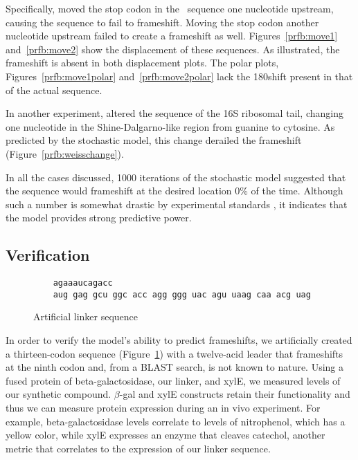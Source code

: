 \documentclass[12pt, draft]{article}
\numberwithin{equation}{section}
\begin{document}

Specifically, \citeauthor{weiss87} moved the stop codon in the
\prfB\ sequence one nucleotide upstream, causing the sequence to fail to
frameshift. Moving the stop codon another nucleotide upstream failed
to create a frameshift as well.  Figures~\ref{prfb:move1} and~\ref{prfb:move2}
show the displacement of these sequences.  As illustrated,
the frameshift is absent in both displacement plots.  The polar
plots, Figures~\ref{prfb:move1polar} and~\ref{prfb:move2polar}
lack the 180\degree shift present in that of the actual sequence.

In another experiment, \citeauthor{weiss88} altered the sequence of the
16S ribosomal tail, changing one nucleotide in the Shine-Dalgarno-like region
from guanine to cytosine.  As predicted by the stochastic model, this
change derailed the frameshift (Figure~\ref{prfb:weisschange}).

In all the cases discussed, 1000 iterations of the stochastic model
suggested that the sequence would frameshift at the desired location 0\%
of the time.  Although such a number is somewhat drastic by experimental
standards \cite{weiss87,weiss88}, it indicates that the model provides
strong predictive power.



\subsection{Verification}

\begin{figure}
  \caption{Artificial linker sequence}
  \label{linker}
  \begin{verbatim}
    agaaaucagacc
    aug gag gcu ggc acc agg ggg uac agu uaag caa acg uag
  \end{verbatim}
\end{figure}

In order to verify the model's ability to predict frameshifts, we
artificially created a thirteen-codon sequence (Figure~\ref{linker})
with a twelve-acid leader that frameshifts at the ninth codon and,
from a BLAST search, is not known to nature.  Using a fused protein of
beta-galactosidase, our linker, and xylE, we measured levels of our
synthetic compound. $\beta$-gal and xylE constructs retain their
functionality and thus we can measure protein expression during an in
vivo experiment. For example, beta-galactosidase levels correlate to
levels of nitrophenol, which has a yellow color, while xylE expresses
an enzyme that cleaves catechol, another metric that correlates to the
expression of our linker sequence.


\begin{singlespace}
  
\end{singlespace}
\end{document}
